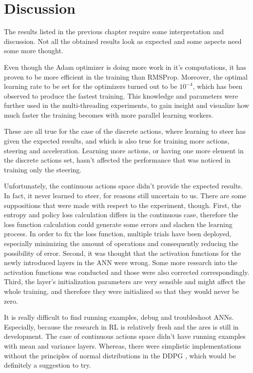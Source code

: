 \chapter{Discussion}\label{Discussion}
The results listed in the previous chapter require some interpretation and discussion. Not all the obtained results look as expected and some aspects need some more thought.

Even though the Adam optimizer is doing more work in it's computations, it has proven to be more efficient in the training than RMSProp. Moreover, the optimal learning rate to be set for the optimizers turned out to be $10^{-4}$, which has been observed to produce the fastest training. This knowledge and parameters were further used in the multi-threading experiments, to gain insight and visualize how much faster the training becomes with more parallel learning workers.

These are all true for the case of the discrete actions, where learning to steer has given the expected results, and which is also true for training more actions, steering and acceleration. Learning more actions, or having one more element in the discrete actions set, hasn't affected the performance that was noticed in training only the steering.

Unfortunately, the continuous actions space didn't provide the expected results. In fact, it never learned to steer, for reasons still uncertain to us. There are some suppositions that were made with respect to the experiment, though. First, the entropy and policy loss calculation differs in the continuous case, therefore the loss function calculation could generate some errors and slacken the learning process. In order to fix the loss function, multiple trials have been deployed, especially minimizing the amount of operations and consequently reducing the possibility of error. Second, it was thought that the activation functions for the newly introduced layers in the ANN were wrong. Some more research into the activation functions was conducted and those were also corrected correspondingly. Third, the layer's initialization parameters are very sensible and might affect the whole training, and therefore they were initialized so that they would never be zero. 

It is really difficult to find running examples, debug and troubleshoot ANNs. Especially, because the research in RL is relatively fresh and the ares is still in development. The case of continuous actions space didn't have running examples with mean and variance layers. Whereas, there were simplistic implementations without the principles of normal distributions in the DDPG \cite{DDPG_Torcs}, which would be definitely a suggestion to try.


